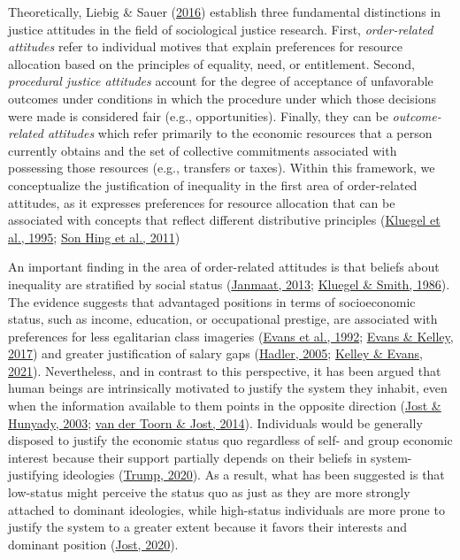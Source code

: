 \documentclass[
  12pt,
  a4paper,
]{article}
\begin{document}
Theoretically, Liebig \& Sauer
(\protect\hyperlink{ref-liebigSociologyJustice2016}{2016}) establish
three fundamental distinctions in justice attitudes in the field of
sociological justice research. First, \emph{order-related attitudes}
refer to individual motives that explain preferences for resource
allocation based on the principles of equality, need, or entitlement.
Second, \emph{procedural justice attitudes} account for the degree of
acceptance of unfavorable outcomes under conditions in which the
procedure under which those decisions were made is considered fair
(e.g., opportunities). Finally, they can be \emph{outcome-related
attitudes} which refer primarily to the economic resources that a person
currently obtains and the set of collective commitments associated with
possessing those resources (e.g., transfers or taxes). Within this
framework, we conceptualize the justification of inequality in the first
area of order-related attitudes, as it expresses preferences for
resource allocation that can be associated with concepts that reflect
different distributive principles
(\protect\hyperlink{ref-kluegel_social_1995}{Kluegel et al., 1995};
\protect\hyperlink{ref-sonhing_merit_2011}{Son Hing et al., 2011})

An important finding in the area of order-related attitudes is that
beliefs about inequality are stratified by social status
(\protect\hyperlink{ref-janmaatSubjectiveInequalityReview2013}{Janmaat,
2013};
\protect\hyperlink{ref-kluegelBeliefsInequalityAmericans1986}{Kluegel \&
Smith, 1986}). The evidence suggests that advantaged positions in terms
of socioeconomic status, such as income, education, or occupational
prestige, are associated with preferences for less egalitarian class
imageries (\protect\hyperlink{ref-Evans1992}{Evans et al., 1992};
\protect\hyperlink{ref-Evans2017}{Evans \& Kelley, 2017}) and greater
justification of salary gaps
(\protect\hyperlink{ref-hadler_why_2005}{Hadler, 2005};
\protect\hyperlink{ref-kelley_legitimate_2021}{Kelley \& Evans, 2021}).
Nevertheless, and in contrast to this perspective, it has been argued
that human beings are intrinsically motivated to justify the system they
inhabit, even when the information available to them points in the
opposite direction (\protect\hyperlink{ref-jost_psychology_2003}{Jost \&
Hunyady, 2003}; \protect\hyperlink{ref-vandertoorn_twenty_2014}{van der
Toorn \& Jost, 2014}). Individuals would be generally disposed to
justify the economic status quo regardless of self- and group economic
interest because their support partially depends on their beliefs in
system-justifying ideologies
(\protect\hyperlink{ref-trump_when_2020}{Trump, 2020}). As a result,
what has been suggested is that low-status might perceive the status quo
as just as they are more strongly attached to dominant ideologies, while
high-status individuals are more prone to justify the system to a
greater extent because it favors their interests and dominant position
(\protect\hyperlink{ref-jost_theory_2020}{Jost, 2020}).
\end{document}
